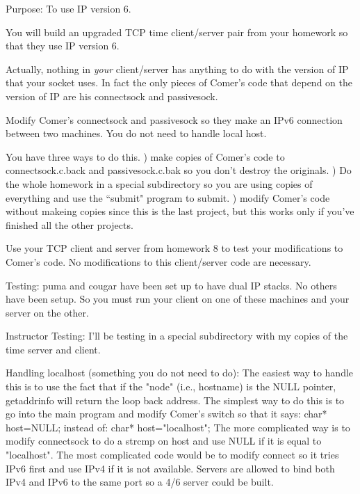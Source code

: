 

\parindent 0pt

Purpose: To use IP version 6.

You will build an upgraded TCP time client/server pair
from your homework so that they use IP version 6.

Actually, nothing in {\it your} client/server has anything
to do with the version of IP that your socket uses.
In fact the only pieces of Comer's code that depend
on the version of IP are his {\ltt{}connectsock}
and {\ltt{}passivesock}.

Modify Comer's {\ltt{}connectsock} and {\ltt{}passivesock} so they
make an IPv6 connection between two machines.
You do not need to handle local host.

You have three ways to do this.
\hfill{}) make copies of Comer's code to {\ltt{}connectsock.c.back}
and {\ltt{}passivesock.c.bak} so you don't destroy the originals.
\hfill{}) Do the whole homework in a special subdirectory so you are
using copies of everything and use the ``submit" program to submit.
\hfill{}) modify Comer's code without makeing copies since this is the
last project, but this works only if you've finished all the other
projects.

Use your TCP client and server from homework 8 to test
your modifications to Comer's code.
No modifications to this client/server code are necessary.

Testing: {\ltt{}puma} and {\ltt{}cougar} have been set up to
have dual IP stacks. No others have been setup. So you must
run your client on one of these machines and your server
on the other.

Instructor Testing: I'll be testing in a special subdirectory
with my copies of the time server and client.

Handling localhost (something you do not need to do):
The easiest way to handle this is to use the fact that
if the "node" (i.e., hostname) is the {\ltt{}NULL} pointer, {\ltt{}getaddrinfo}
will return the loop back address.
The simplest way to do this is to go into the main program
and modify Comer's switch so that it says:
\hfill\break
{\ltt{}char* host=NULL;}
\hfill\break
instead of:
\hfill\break
{\ltt{}char* host="localhost";}
\hfill\break
The more complicated way is to modify {\ltt{}connectsock} to
do a {\ltt{}strcmp} on {\ltt{}host} and use {\ltt{}NULL} if it is
equal to {\ltt{}"localhost"}.
The most complicated code would be to modify connect 
so it tries IPv6 first and use IPv4 if it is not available.
Servers are allowed to bind both IPv4 and IPv6 to the same port so
a 4/6 server could be built.

\bye
